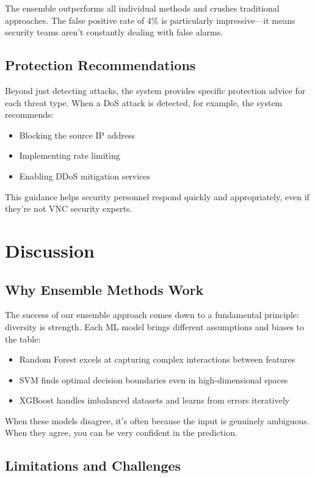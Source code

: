 \documentclass[conference]{IEEEtran}
\begin{document}
The ensemble outperforms all individual methods and crushes traditional approaches. The false positive rate of 4\% is particularly impressive—it means security teams aren't constantly dealing with false alarms.

\subsection{Protection Recommendations}

Beyond just detecting attacks, the system provides specific protection advice for each threat type. When a DoS attack is detected, for example, the system recommends:

\begin{itemize}
\item Blocking the source IP address
\item Implementing rate limiting
\item Enabling DDoS mitigation services
\end{itemize}

This guidance helps security personnel respond quickly and appropriately, even if they're not VNC security experts.

\section{Discussion}

\subsection{Why Ensemble Methods Work}

The success of our ensemble approach comes down to a fundamental principle: diversity is strength. Each ML model brings different assumptions and biases to the table:

\begin{itemize}
\item Random Forest excels at capturing complex interactions between features
\item SVM finds optimal decision boundaries even in high-dimensional spaces
\item XGBoost handles imbalanced datasets and learns from errors iteratively
\end{itemize}

When these models disagree, it's often because the input is genuinely ambiguous. When they agree, you can be very confident in the prediction.

\subsection{Limitations and Challenges}
\end{document}

